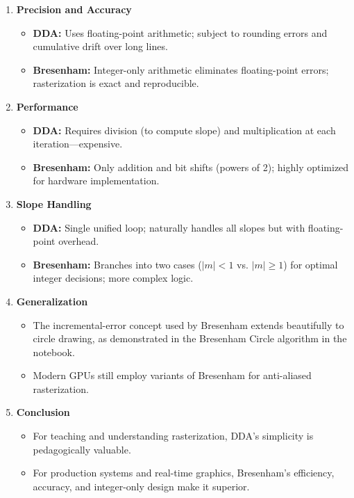 \documentclass[12pt,a4paper]{article}
\begin{document}
\begin{enumerate}
  \item \textbf{\textcolor{coralred}{Precision and Accuracy}}
  \begin{itemize}
    \item \textbf{DDA:} Uses floating-point arithmetic; subject to rounding errors and cumulative drift over long lines.
    \item \textbf{Bresenham:} Integer-only arithmetic eliminates floating-point errors; rasterization is exact and reproducible.
  \end{itemize}

  \item \textbf{\textcolor{coralred}{Performance}}
  \begin{itemize}
    \item \textbf{DDA:} Requires division (to compute slope) and multiplication at each iteration—expensive.
    \item \textbf{Bresenham:} Only addition and bit shifts (powers of 2); highly optimized for hardware implementation.
  \end{itemize}

  \item \textbf{\textcolor{coralred}{Slope Handling}}
  \begin{itemize}
    \item \textbf{DDA:} Single unified loop; naturally handles all slopes but with floating-point overhead.
    \item \textbf{Bresenham:} Branches into two cases ($|m| < 1$ vs. $|m| \ge 1$) for optimal integer decisions; more complex logic.
  \end{itemize}

  \item \textbf{\textcolor{coralred}{Generalization}}
  \begin{itemize}
    \item The incremental-error concept used by Bresenham extends beautifully to circle drawing, as demonstrated in the Bresenham Circle algorithm in the notebook.
    \item Modern GPUs still employ variants of Bresenham for anti-aliased rasterization.
  \end{itemize}

  \item \textbf{\textcolor{coralred}{Conclusion}}
  \begin{itemize}
    \item For teaching and understanding rasterization, DDA's simplicity is pedagogically valuable.
    \item For production systems and real-time graphics, Bresenham's efficiency, accuracy, and integer-only design make it superior.
  \end{itemize}
\end{enumerate}
\end{document}
